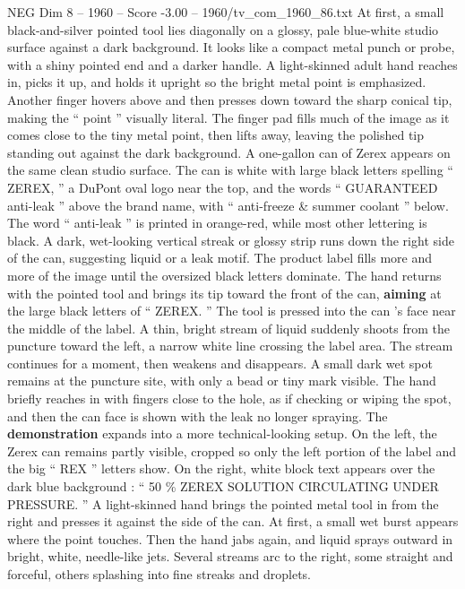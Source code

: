 \begin{textsample}{NEG Dim 8 – 1960 – Score -3.00 – 1960/tv\_com\_1960\_86.txt}  \label{ex:f8_neg_006}
At first, a small black-and-silver pointed tool lies diagonally on a glossy, pale blue-white studio surface against a dark background.
It looks like a compact metal punch or probe, with a shiny pointed end and a darker handle.
A light-skinned adult hand reaches in, picks it up, and holds it upright so the bright metal point is emphasized.
Another finger hovers above and then presses down toward the sharp conical tip, making the “ point ” visually literal.
The finger pad fills much of the image as it comes close to the tiny metal point, then lifts away, leaving the polished tip standing out against the dark background.
A one-gallon can of Zerex appears on the same clean studio surface.
The can is white with large black letters spelling “ ZEREX, ” a DuPont oval logo near the top, and the words “ GUARANTEED anti-leak ” above the brand name, with “ anti-freeze \& summer coolant ” below.
The word “ anti-leak ” is printed in orange-red, while most other lettering is black.
A dark, wet-looking vertical streak or glossy strip runs down the right side of the can, suggesting liquid or a leak motif.
The product label fills more and more of the image until the oversized black letters dominate.
The hand returns with the pointed tool and brings its tip toward the front of the can, \textbf{aiming} at the large black letters of “ ZEREX. ” The tool is pressed into the can ’s face near the middle of the label.
A thin, bright stream of liquid suddenly shoots from the puncture toward the left, a narrow white line crossing the label area.
The stream continues for a moment, then weakens and disappears.
A small dark wet spot remains at the puncture site, with only a bead or tiny mark visible.
The hand briefly reaches in with fingers close to the hole, as if checking or wiping the spot, and then the can face is shown with the leak no longer spraying.
The \textbf{demonstration} expands into a more technical-looking setup.
On the left, the Zerex can remains partly visible, cropped so only the left portion of the label and the big “ REX ” letters show.
On the right, white block text appears over the dark blue background : “ 50 \% ZEREX SOLUTION CIRCULATING UNDER PRESSURE. ” A light-skinned hand brings the pointed metal tool in from the right and presses it against the side of the can.
At first, a small wet burst appears where the point touches.
Then the hand jabs again, and liquid sprays outward in bright, white, needle-like jets.
Several streams arc to the right, some straight and forceful, others splashing into fine streaks and droplets.

\end{textsample}
